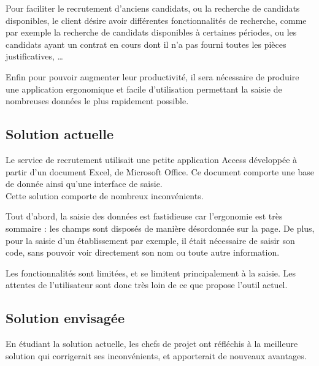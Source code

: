 Pour faciliter le recrutement d'anciens candidats, ou la recherche de candidats disponibles, le client désire avoir différentes fonctionnalités de recherche, comme par exemple la recherche de candidats disponibles à certaines périodes, ou les candidats ayant un contrat en cours dont il n'a pas fourni toutes les pièces justificatives, \ldots

Enfin pour pouvoir augmenter leur productivité, il sera nécessaire de produire une application ergonomique et facile d'utilisation permettant la saisie de nombreuses données le plus rapidement possible.


\subsection{Solution actuelle}

Le service de recrutement utilisait une petite application Access développée à partir d'un document Excel, de Microsoft Office.
Ce document comporte une base de donnée ainsi qu'une interface de saisie.
\\

Cette solution comporte de nombreux inconvénients.

Tout d'abord, la saisie des données est fastidieuse car l'ergonomie est très sommaire : les champs sont disposés de manière désordonnée sur la page.
De plus, pour la saisie d'un établissement par exemple, il était nécessaire de saisir son code, sans pouvoir voir directement son nom ou toute autre information.

Les fonctionnalités sont limitées, et se limitent principalement à la saisie.
Les attentes de l'utilisateur sont donc très loin de ce que propose l'outil actuel.


\subsection{Solution envisagée}

En étudiant la solution actuelle, les chefs de projet ont réfléchis à la meilleure solution qui corrigerait ses inconvénients, et apporterait de nouveaux avantages.
\\

